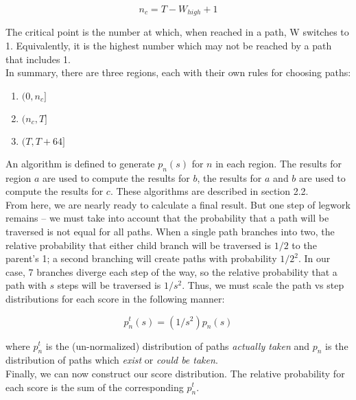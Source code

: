 \documentclass[a4paper, 11pt]{article}
\begin{document}
\[ n_c = T - W_{high} + 1 \]



The critical point is the number at which, when reached in a path, W switches to 1. Equivalently, it is the highest number which may not be reached by a path that includes 1.\\

In summary, there are three regions, each with their own rules for choosing paths:

\medskip

\begin{enumerate}[\hspace{5mm}a.]

	\item $(0, n_c]$

	\item $(n_c, T]$

	\item $(T, T + 64]$

\end{enumerate}
\medskip

An algorithm is defined to generate $p_n(s)$ for $n$ in each region. The results for region $a$ are used to compute the results for $b$, the results for $a$ and $b$ are used to compute the results for $c$. These algorithms are described in section 2.2.\\

From here, we are nearly ready to calculate a final result. But one step of legwork remains -- we must take into account that the probability that a path will be traversed is not equal for all paths. When a single path branches into two, the relative probability that either child branch will be traversed is $1/2$ to the parent's 1; a second branching will create paths with probability $1/2^2$. In our case, 7 branches diverge each step of the way, so the relative probability that a path with $s$ steps will be traversed is $1/s^2$. Thus, we must scale the path vs step distributions for each score in the following manner:

\[ p_n^t(s) = (1 / s^2)p_n(s) \]

where $p_n^t$ is the (un-normalized) distribution of paths \textit{actually taken} and $p_n$ is the distribution of paths which \textit{exist} or \textit{could be taken}.\\

Finally, we can now construct our score distribution. The relative probability for each score is the sum of the corresponding $p_n^t$.
\end{document}
